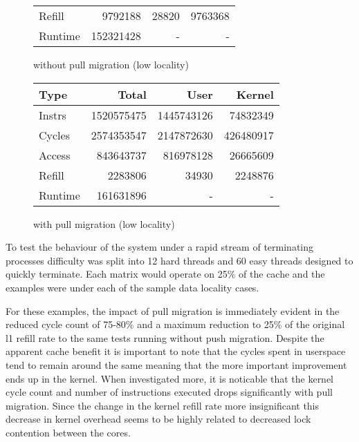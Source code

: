 \documentclass[11pt]{article}
\begin{document}
\begin{figure*}[h]
\begin{subtable}{.48\textwidth}
\begin{tabular}{l|rrr}
			Refill  & 9792188    & 28820      & 9763368    \\ 
			Runtime & 152321428  & -          & -          \\ 
			\hline
		\end{tabular}
		\caption{without pull migration (low locality)}
	\end{subtable}
	\hfill
	\begin{subtable}{.48\textwidth}
		\centering                 
		\begin{tabular}{l|rrr}  
			Type    & Total      & User       & Kernel    \\
			\hline
			Instrs  & 1520575475 & 1445743126 & 74832349  \\ 
			Cycles  & 2574353547 & 2147872630 & 426480917 \\ 
			Access  & 843643737  & 816978128  & 26665609  \\ 
			Refill  & 2283806    & 34930      & 2248876   \\ 
			Runtime & 161631896  & -          & -         \\ 
			\hline
		\end{tabular}
		\caption{with pull migration (low locality)}        
	\end{subtable}
\end{figure*}


To test the behaviour of the system under a rapid stream of terminating processes difficulty was split into 12 hard threads and 60 easy threads designed to quickly terminate.  Each matrix would operate on 25\% of the cache and the examples were under each of the sample data locality cases.

For these examples, the impact of pull migration is immediately evident in the reduced cycle count of 75-80\% and a maximum reduction to 25\% of the original l1 refill rate to the same tests running without push migration.  Despite the apparent cache benefit it is important to note that the cycles spent in userspace tend to remain around the same meaning that the more important improvement ends up in the kernel.  When investigated more, it is noticable that the kernel cycle count and number of instructions executed drops significantly with pull migration.  Since the change in the kernel refill rate more insignificant this decrease in kernel overhead seems to be highly related to decreased lock contention between the cores.
\end{document}
